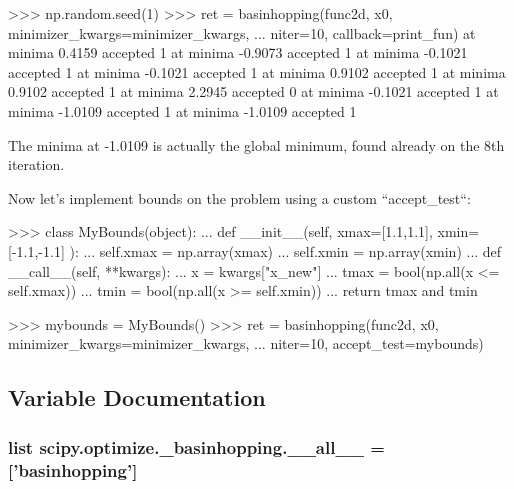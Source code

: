\begin{DoxyVerb}
>>> np.random.seed(1)
>>> ret = basinhopping(func2d, x0, minimizer_kwargs=minimizer_kwargs,
...                    niter=10, callback=print_fun)
at minima 0.4159 accepted 1
at minima -0.9073 accepted 1
at minima -0.1021 accepted 1
at minima -0.1021 accepted 1
at minima 0.9102 accepted 1
at minima 0.9102 accepted 1
at minima 2.2945 accepted 0
at minima -0.1021 accepted 1
at minima -1.0109 accepted 1
at minima -1.0109 accepted 1


The minima at -1.0109 is actually the global minimum, found already on the
8th iteration.

Now let's implement bounds on the problem using a custom ``accept_test``:

>>> class MyBounds(object):
...     def __init__(self, xmax=[1.1,1.1], xmin=[-1.1,-1.1] ):
...         self.xmax = np.array(xmax)
...         self.xmin = np.array(xmin)
...     def __call__(self, **kwargs):
...         x = kwargs["x_new"]
...         tmax = bool(np.all(x <= self.xmax))
...         tmin = bool(np.all(x >= self.xmin))
...         return tmax and tmin

>>> mybounds = MyBounds()
>>> ret = basinhopping(func2d, x0, minimizer_kwargs=minimizer_kwargs,
...                    niter=10, accept_test=mybounds)\end{DoxyVerb}
 

\subsection{Variable Documentation}
\hypertarget{namespacescipy_1_1optimize_1_1__basinhopping_a47ca6452454c4eae46b270e28300380e}{}
\subsubsection[{\+\_\+\+\_\+all\+\_\+\+\_\+}]{\setlength{\rightskip}{0pt plus 5cm}list scipy.\+optimize.\+\_\+basinhopping.\+\_\+\+\_\+all\+\_\+\+\_\+ = \mbox{[}'{\bf basinhopping}'\mbox{]}}\label{namespacescipy_1_1optimize_1_1__basinhopping_a47ca6452454c4eae46b270e28300380e}
\hypertarget{namespacescipy_1_1optimize_1_1__basinhopping_af1073cfc3f47000d71431e4d4f033b21}{}
